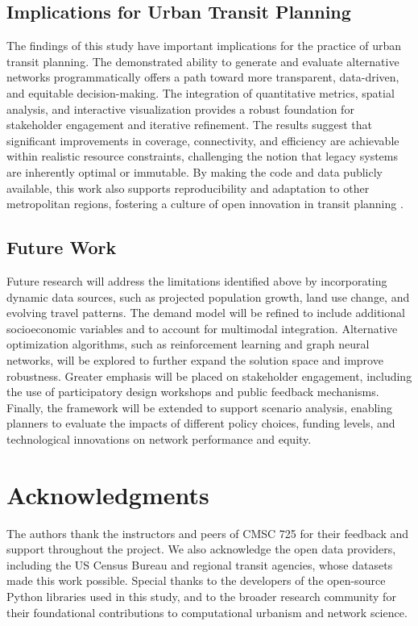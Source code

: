 \documentclass[manuscript,screen,review]{acmart}
\begin{document}
\subsection{Implications for Urban Transit Planning}
The findings of this study have important implications for the practice of urban transit planning. The demonstrated ability to generate and evaluate alternative networks programmatically offers a path toward more transparent, data-driven, and equitable decision-making. The integration of quantitative metrics, spatial analysis, and interactive visualization provides a robust foundation for stakeholder engagement and iterative refinement. The results suggest that significant improvements in coverage, connectivity, and efficiency are achievable within realistic resource constraints, challenging the notion that legacy systems are inherently optimal or immutable. By making the code and data publicly available, this work also supports reproducibility and adaptation to other metropolitan regions, fostering a culture of open innovation in transit planning \cite{bib:bast2016route, bib:chien2001genetic}.

\subsection{Future Work}
Future research will address the limitations identified above by incorporating dynamic data sources, such as projected population growth, land use change, and evolving travel patterns. The demand model will be refined to include additional socioeconomic variables and to account for multimodal integration. Alternative optimization algorithms, such as reinforcement learning and graph neural networks, will be explored to further expand the solution space and improve robustness. Greater emphasis will be placed on stakeholder engagement, including the use of participatory design workshops and public feedback mechanisms. Finally, the framework will be extended to support scenario analysis, enabling planners to evaluate the impacts of different policy choices, funding levels, and technological innovations on network performance and equity.

\section{Acknowledgments}

The authors thank the instructors and peers of CMSC 725 for their feedback and support throughout the project. We also acknowledge the open data providers, including the US Census Bureau and regional transit agencies, whose datasets made this work possible. Special thanks to the developers of the open-source Python libraries used in this study, and to the broader research community for their foundational contributions to computational urbanism and network science.
\end{document}
